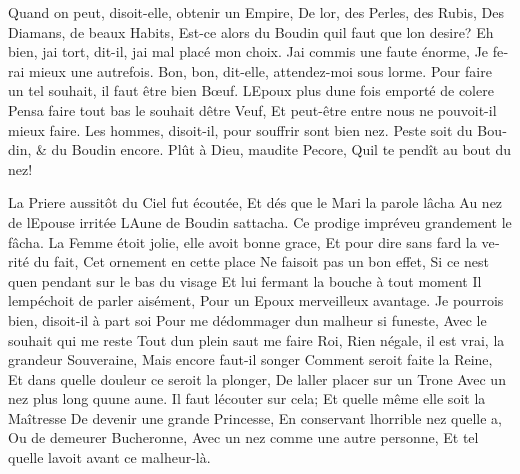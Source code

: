 \documentclass[14pt,a4paper]{memoir}
\begin{document}
\begin{otherlanguage}{french}
{Quand on peut, disoit-elle, obtenir un Empire,} {De
l\textquotesingle or, des Perles, des Rubis,} {Des Diamans, de beaux
Habits,} {Est-ce alors du Boudin qu\textquotesingle il faut que
l\textquotesingle on desire?} {Eh bien, j\textquotesingle ai tort,
dit-il, j\textquotesingle ai mal placé mon choix.} {J\textquotesingle ai
commis une faute énorme,} {Je ferai mieux une autrefois.} {Bon, bon,
dit-elle, attendez-moi sous l\textquotesingle orme.} {Pour faire un tel
souhait, il faut être bien Bœuf.} {L\textquotesingle Epoux plus
d\textquotesingle une fois emporté de colere} {Pensa faire tout bas le
souhait d\textquotesingle être Veuf,} {Et peut-être entre nous ne
pouvoit-il mieux faire.} {Les hommes, disoit-il, pour souffrir sont bien
nez.} {Peste soit du Boudin, \& du Boudin encore.} {Plût à Dieu, maudite
Pecore,} {Qu\textquotesingle il te pendît au bout du nez!}

{La Priere aussitôt du Ciel fut écoutée,} {Et dés que le Mari la parole
lâcha} {Au nez de l\textquotesingle Epouse irritée}
{L\textquotesingle Aune de Boudin s\textquotesingle attacha.} {Ce
prodige impréveu grandement le fâcha.} {La Femme étoit jolie, elle avoit
bonne grace,} {Et pour dire sans fard la verité du fait,} {Cet ornement
en cette place} {Ne faisoit pas un bon effet,} {Si ce
n\textquotesingle est qu\textquotesingle en pendant sur le bas du
visage} {Et lui fermant la bouche à tout moment} {Il
l\textquotesingle empéchoit de parler aisément,} {Pour un Epoux
merveilleux avantage.} {Je pourrois bien, disoit-il à part soi} {Pour me
dédommager d\textquotesingle un malheur si funeste,} {Avec le souhait
qui me reste} {Tout d\textquotesingle un plein saut me faire Roi,} {Rien
n\textquotesingle égale, il est vrai, la grandeur Souveraine,} {Mais
encore faut-il songer} {Comment seroit faite la Reine,} {Et dans quelle
douleur ce seroit la plonger,} {De l\textquotesingle aller placer sur un
Trone} {Avec un nez plus long qu\textquotesingle une aune.} {Il faut
l\textquotesingle écouter sur cela;} {Et qu\textquotesingle elle même
elle soit la Maîtresse} {De devenir une grande Princesse,} {En
conservant l\textquotesingle horrible nez qu\textquotesingle elle a,}
{Ou de demeurer Bucheronne,} {Avec un nez comme une autre personne,} {Et
tel qu\textquotesingle elle l\textquotesingle avoit avant ce
malheur-là.}


\end{otherlanguage}
\end{document}
